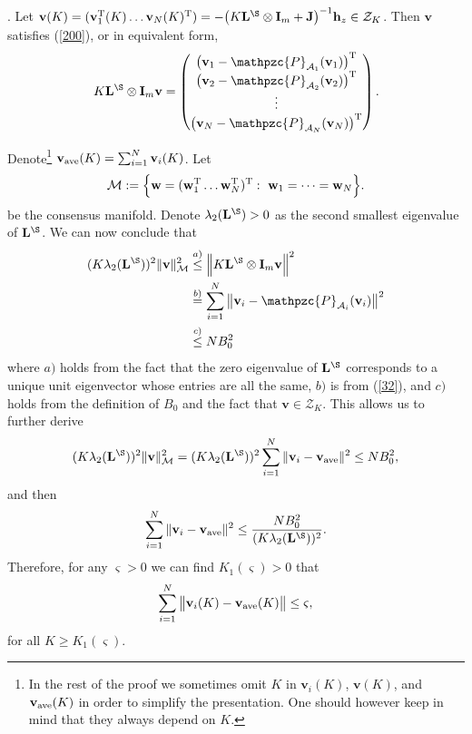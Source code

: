 \documentclass[a4paper, 11pt]{article}
\def\T{^{\rm\tiny T}}
\begin{document}
 \medskip

 . Let $\mathbf{v}(K)= (\mathbf{v}_1\T(K) \dots \mathbf{v}_N(K)\T)=- \big( K \mathbf{L}^\S\otimes \mathbf{I}_m +\mathbf{J}\big)^{-1} {\mathbf{h}_z}\in\mathcal{Z}_K$. Then  $\mathbf{v}$  satisfies  (\ref{200}), or in equivalent form,
\begin{align}\label{32}
K \mathbf{L}^\S\otimes \mathbf{I}_m \mathbf{v} = \begin{pmatrix}
 \big(\mathbf{v}_1-\mathpzc{P}_{\mathcal{A}_1}(\mathbf{v}_1)\big)\T \\
 \big(\mathbf{v}_2-\mathpzc{P}_{\mathcal{A}_2}(\mathbf{v}_2)\big)\T \\
  \vdots  \\
 \big(\mathbf{v}_N-\mathpzc{P}_{\mathcal{A}_N}(\mathbf{v}_N)\big)\T
 \end{pmatrix}.
\end{align}

 Denote\footnote{In the rest of the proof we sometimes omit $K$ in $\mathbf{v}_i(K)$, $\mathbf{v}(K)$, and $\mathbf{v}_{\rm ave}(K)$ in order to simplify the presentation. One should however keep in mind that they always depend on $K$.} $\mathbf{v}_{\rm ave}(K)=\sum_{i=1}^N \mathbf{v}_i(K)$. Let
 \begin{align}
\mathcal{M}:= \Big\{\mathbf{w}=( \mathbf{w}_1\T \dots  \mathbf{w}_N\T)\T: \ \mathbf{w}_1=\dots=\mathbf{w}_N\Big\}.
\end{align}
be the consensus manifold. Denote $\lambda_2(\mathbf{L}^\S)>0$ as the second smallest eigenvalue of $\mathbf{L}^\S$. We can now conclude that
\begin{align}
( K \lambda_2(\mathbf{L}^\S) )^2\|\mathbf{v}\|_{\mathcal{M}}^2
 & \stackrel{a)}{\leq} \Big\|K \mathbf{L}^\S\otimes \mathbf{I}_m \mathbf{v}\Big\|^2 \nonumber\\
 &\stackrel{b)}{=} \sum_{i=1}^N \big\| \mathbf{v}_i-\mathpzc{P}_{\mathcal{A}_i}(\mathbf{v}_i) \big\|^2 \nonumber\\
  &\stackrel{c)}{\leq} N B_0^2
\end{align}
where  $a)$ holds from the fact that the zero eigenvalue of $\mathbf{L}^\S$ corresponds to a unique unit eigenvector whose entries  are all the same, $b)$ is from (\ref{32}), and $c)$ holds from the definition of $B_0$ and the fact that $\mathbf{v}\in\mathcal{Z}_K$. This allows us to further derive
\begin{align}
(K \lambda_2(\mathbf{L}^\S))^2 \|\mathbf{v}\|_{\mathcal{M}}^2  = (K \lambda_2(\mathbf{L}^\S))^2\sum_{i=1}^N \|\mathbf{v}_i -\mathbf{v}_{\rm ave}\|^2 \leq N B_0^2,
\end{align}
and then \begin{align}
\sum_{i=1}^N \|\mathbf{v}_i -\mathbf{v}_{\rm ave}\|^2 \leq \frac{ N B_0^2}{ (K \lambda_2(\mathbf{L}^\S))^2}.
\end{align}
Therefore, for any $\varsigma>0$ we can find $K_1(\varsigma)>0 $ that
\begin{align}\label{31}
\sum_{i=1}^N \big\|\mathbf{v}_i(K) -\mathbf{v}_{\rm ave}(K)\big\| \leq \varsigma,
\end{align}
for all $K\geq K_1(\varsigma)$.
\end{document}
